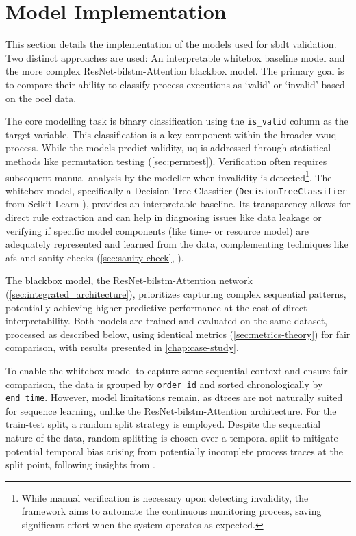 \section{Model Implementation}

This section details the implementation of the models used for \gls{sbdt} validation. Two distinct approaches are used: An interpretable whitebox baseline model and the more complex ResNet-\gls{bilstm}-Attention blackbox model. The primary goal is to compare their ability to classify process executions as `valid' or `invalid' based on the \gls{ocel} data.

The core modelling task is binary classification using the \texttt{is\_valid} column as the target variable. This classification is a key component within the broader \gls{vvuq} process. While the models predict validity, \gls{uq} is addressed through statistical methods like permutation testing (\autoref{sec:permtest}). Verification often requires subsequent manual analysis by the modeller when invalidity is detected\footnote{While manual verification is necessary upon detecting invalidity, the framework aims to automate the continuous monitoring process, saving significant effort when the system operates as expected.}. The whitebox model, specifically a Decision Tree Classifier (\texttt{DecisionTreeClassifier} from Scikit-Learn \autocite{Scikit-Learn}), provides an interpretable baseline. Its transparency allows for direct rule extraction and can help in diagnosing issues like data leakage or verifying if specific model components (like time- or resource model) are adequately represented and learned from the data, complementing techniques like \gls{afs} and sanity checks (\autoref{sec:sanity-check}, \textcite{adebayo2018sanity}).

The blackbox model, the ResNet-\gls{bilstm}-Attention network (\autoref{sec:integrated_architecture}), prioritizes capturing complex sequential patterns, potentially achieving higher predictive performance at the cost of direct interpretability. Both models are trained and evaluated on the same dataset, processed as described below, using identical metrics (\autoref{sec:metrics-theory}) for fair comparison, with results presented in \autoref{chap:case-study}.

To enable the whitebox model to capture some sequential context and ensure fair comparison, the data is grouped by \texttt{order\_id} and sorted chronologically by \texttt{end\_time}. However, model limitations remain, as \gls{dtree}s are not naturally suited for sequence learning, unlike the ResNet-\gls{bilstm}-Attention architecture. For the train-test split, a random split strategy is employed. Despite the sequential nature of the data, random splitting is chosen over a temporal split to mitigate potential temporal bias arising from potentially incomplete process traces at the split point, following insights from \textcite{morita2022investigation}.

